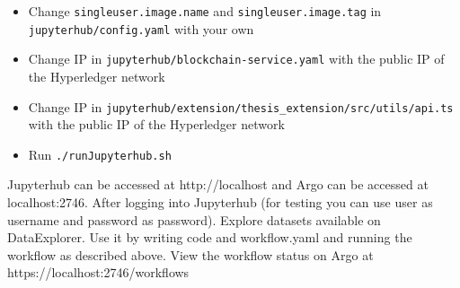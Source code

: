 \begin{itemize}
    \item Change \lstinline{singleuser.image.name} and \lstinline{singleuser.image.tag} in \lstinline{jupyterhub/config.yaml} with your own

    \item Change IP in \lstinline{jupyterhub/blockchain-service.yaml} with the public IP of the Hyperledger network

    \item Change IP in \lstinline{jupyterhub/extension/thesis_extension/src/utils/api.ts} with the public IP of the Hyperledger  network

    \item Run \lstinline{./runJupyterhub.sh}
\end{itemize}
Jupyterhub can be accessed at http://localhost and Argo can be accessed at localhost:2746. After logging into Jupyterhub (for testing you can use user as username and password as password). Explore datasets available on DataExplorer. Use it by writing code and workflow.yaml and running the workflow as described above. View the workflow status on Argo at https://localhost:2746/workflows